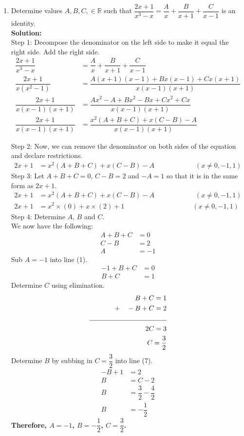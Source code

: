 \documentclass[12pt]{book}
\begin{document}
\begin{enumerate}
\newpage

\item Determine values $A,B,C, \in \mathbb{R}$ such that $\dfrac{2x+1}{x^3-x} = \dfrac{A}{x}+\dfrac{B}{x+1}+\dfrac{C}{x-1}$ is an identity.\\

\textbf{Solution:}\\
Step 1: Decompose the denominator on the left side to make it equal the right side. Add the right side.
\begingroup
\addtolength{\jot}{1em}
\begin{align*}
    \dfrac{2x+1}{x^3 - x} &= \dfrac{A}{x}+\dfrac{B}{x+1}+\dfrac{C}{x-1}\\
    \dfrac{2x+1}{x(x^2-1)} &= \dfrac{A(x+1)(x-1) + Bx(x-1) + Cx(x+1)}{x(x-1)(x+1)}\\
    \dfrac{2x+1}{x(x-1)(x+1)} &= \dfrac{Ax^2 - A + Bx^2 - Bx + Cx^2 + Cx}{x(x-1)(x+1)}\\
    \dfrac{2x+1}{x(x-1)(x+1)} &= \dfrac{x^2(A+B+C) + x(C-B) - A}{x(x-1)(x+1)}
\end{align*}
\endgroup

Step 2: Now, we can remove the denominator on both sides of the equation and declare restrictions.
\begin{align*}
    2x+1 &= x^2(A+B+C) + x(C-B) - A \qquad\qquad\qquad (x \neq 0, -1, 1)
\end{align*}
Step 3: Let $A+B+C = 0$, $C-B = 2$ and $-A = 1$ so that it is in the same form as $2x + 1$.
\begin{align*}
    2x+1 &= x^2(A+B+C) + x(C-B) - A \qquad\qquad\qquad (x \neq 0, -1, 1)\\
    2x+1 &= x^2 \times (0) + x \times (2) + 1 \qquad\qquad\qquad\qquad\qquad (x \neq 0, -1, 1)
\end{align*}
Step 4: Determine $A$, $B$ and $C$.\\
We now have the following:
\setcounter{equation}{0}
\begin{align}
    A+B+C &= 0\\
    C - B &= 2\\
    A &= -1
\end{align}
Sub $A = -1$ into line (1).
\begin{align}
    -1+B+C &= 0\\
    B+C&= 1
\end{align}
Determine $C$ using elimination.
\begin{align}
    B+C = 1&\\
    +\quad-B + C = 2&\\
    \rule{4cm}{0.4pt}&\\
    2C = 3&\\
    C = \dfrac{3}{2}&
\end{align}
Determine $B$ by subbing in $C = \dfrac{3}{2}$ into line (7).
\begin{align}
    -B + 1&= 2\\
    B &= C - 2\\
    B &= \dfrac{3}{2} - \dfrac{4}{2}\\
    B &= -\dfrac{1}{2}
\end{align}
\textbf{Therefore, $A = -1$, $B = -\dfrac{1}{2}$, $C = \dfrac{3}{2}$.}


\end{enumerate}
\end{document}
